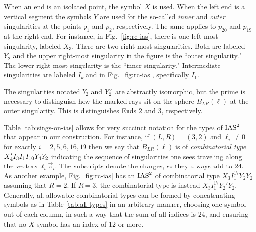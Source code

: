 \documentclass[table,x11names]{amsart}
\begin{document}
When an end is an isolated point, the symbol $X$ is used.
When the left end is a vertical segment
the symbols $Y$ are used for the so-called
{\it inner} and {\it outer} singularities at the points $p_1$ and $p_2$, respectively.
The same applies to $p_{20}$ and $p_{19}$ at the right end.
For instance, in Fig.~\ref{fig:rc-ias}, there 
is one left-most singularity, labeled $X_3$. There are two right-most singularities.
Both are labeled $Y_2$ and the upper right-most singularity in the figure
is the ``outer singularity." The lower right-most singularity is the ``inner singularity."
Intermediate singularities are labeled $I_k$ and in
Fig.~\ref{fig:rc-ias}, specifically $I_1$.

The singularities notated $Y_2$ and $Y'_2$ are abstractly isomorphic,
but the prime is necessary to
distinguish how the marked rays sit on the sphere $B_{LR}(\ell)$
at the outer singularity. This is distinguishes Ends $2$ and $3$, respectively.



\begin{notation}\label{d-notation} Table \ref{tab:sings-on-ias} allows for very succinct notation
for the types of $\operatorname{IAS}^2$ that appear in our construction.
For instance, if $(L,R)=(3,2)$ and $\ell_i\neq 0$
for exactly $i=2,5,6,16,19$ then we say that $B_{LR}(\ell)$
is of {\it combinatorial type} $X'_4I_3I_1I_{10}Y_4 Y_2$
indicating the sequence of singularities one sees traveling along the vectors $\ell_i\vec{v}_i$.
The subscripts denote the charges, so they always add to $24$. As another example,
Fig.~\ref{fig:rc-ias} has an $\operatorname{IAS}^2$ of combinatorial type $X_3I_1^{17}Y_2Y_2$
assuming that $R=2$. If $R=3$, the combinatorial type is instead
$X_3I_1^{17}Y_2'Y_2$. Generally, all allowable combinatorial types can be formed
by concatenating symbols as in Table \ref{tab:all-types} in an arbitrary manner, choosing
one symbol out of each column, in such a way that the sum of all indices is $24$,
and ensuring that no $X$-symbol has an index of $12$ or more.
%
\end{notation}
\end{document}
